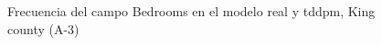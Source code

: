 \begin{figure}[H]
    \centering
    
    \caption{Frecuencia del campo Bedrooms en el modelo real y tddpm, King county (A-3)}
    \label{frecuency-tddpm-bedrooms}
\end{figure}